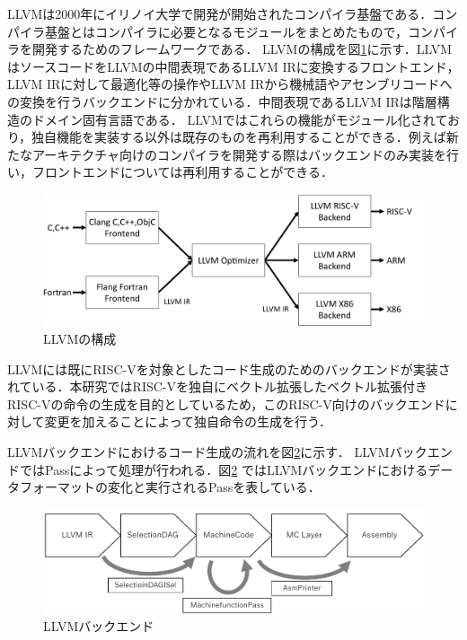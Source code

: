 LLVMは2000年にイリノイ大学で開発が開始されたコンパイラ基盤である．コンパイラ基盤とはコンパイラに必要となるモジュールをまとめたもので，コンパイラを開発するためのフレームワークである．
LLVMの構成を図\ref{fig:LLVM}に示す．LLVMはソースコードをLLVMの中間表現であるLLVM IRに変換するフロントエンド，LLVM IRに対して最適化等の操作やLLVM IRから機械語やアセンブリコードへの変換を行うバックエンドに分かれている．中間表現であるLLVM IRは階層構造のドメイン固有言語である．
LLVMではこれらの機能がモジュール化されており，独自機能を実装する以外は既存のものを再利用することができる．例えば新たなアーキテクチャ向けのコンパイラを開発する際はバックエンドのみ実装を行い，フロントエンドについては再利用することができる．

\begin{figure}[tb]
    \centering
    \includegraphics[scale=0.4]{image/LLVM.pdf}
    \caption{LLVMの構成}
    \label{fig:LLVM}
\end{figure}

LLVMには既にRISC-Vを対象としたコード生成のためのバックエンドが実装されている．本研究ではRISC-Vを独自にベクトル拡張したベクトル拡張付きRISC-Vの命令の生成を目的としているため，このRISC-V向けのバックエンドに対して変更を加えることによって独自命令の生成を行う．

LLVMバックエンドにおけるコード生成の流れを図\ref{fig:LLVM_backend}に示す．
LLVMバックエンドではPassによって処理が行われる．図\ref{fig:LLVM_backend}
ではLLVMバックエンドにおけるデータフォーマットの変化と実行されるPassを表している．

\begin{figure}[tb]
    \centering
    \includegraphics[scale=0.7]{image/backend.pdf}
    \caption{LLVMバックエンド}
    \label{fig:LLVM_backend}
\end{figure}

